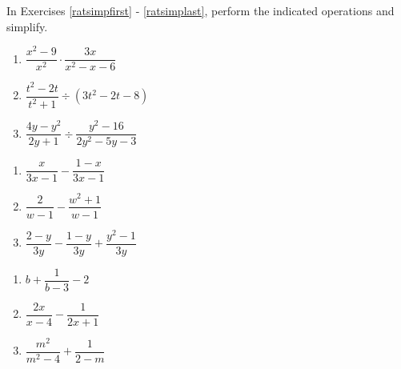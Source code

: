 \documentclass{ximera}
\begin{document}
	\author{Stitz-Zeager}


\label{ExercisesforAppRatExpEqus}

In Exercises \ref{ratsimpfirst} - \ref{ratsimplast}, perform the indicated operations and simplify.

\begin{multicols}{3}
\begin{enumerate}

\item $\dfrac{x^2-9}{x^2} \cdot \dfrac{3x}{x^2-x-6}$\label{ratsimpfirst}
\item $\dfrac{t^2-2t}{t^2+1} \div (3t^2 - 2t - 8)$
\item $\dfrac{4y-y^2}{2y+1} \div \dfrac{y^2-16}{2y^2-5y-3}$

\setcounter{HW}{\value{enumi}}
\end{enumerate}
\end{multicols}

\begin{multicols}{3}
\begin{enumerate}
\setcounter{enumi}{\value{HW}}

\item  $\dfrac{x}{3x-1} - \dfrac{1-x}{3x-1}$
\item  $\dfrac{2}{w-1} - \dfrac{w^2+1}{w-1}$
\item  $\dfrac{2-y}{3y} - \dfrac{1-y}{3y} + \dfrac{y^2-1}{3y}$
 

\setcounter{HW}{\value{enumi}}
\end{enumerate}
\end{multicols}

\begin{multicols}{3}
\begin{enumerate}
\setcounter{enumi}{\value{HW}}

\item  $b+ \dfrac{1}{b-3} - 2$
\item  $\dfrac{2x}{x-4} - \dfrac{1}{2x+1}$
\item  $\dfrac{m^2}{m^2-4} + \dfrac{1}{2-m}$

\setcounter{HW}{\value{enumi}}
\end{enumerate}
\end{multicols}
\end{document}
